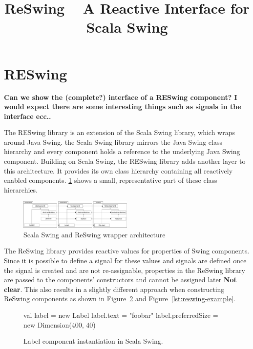 \documentclass{scrartcl}
\title{ReSwing -- A Reactive Interface for Scala Swing}
\author{}
\date{}
\begin{document}
\maketitle






\section{RESwing}

{\bf Can we show the (complete?) interface of a RESwing component? I
  would expect there are some interesting things such as signals in
  the interface ecc..}

The RESwing library is an extension of the Scala Swing library, which
wraps around Java Swing.  the Scala Swing library mirrors the Java
Swing class hierarchy and every component holds a reference to the
underlying Java Swing component. Building on Scala Swing, the RESwing
library adds another layer to this architecture. It provides its own
class hierarchy containing all reactively enabled
components. \ref{fig:overview} shows a small, representative part of
these class hierarchies.

\begin{figure}[htp]
  \centering
  \includegraphics[width=0.5\textwidth]{images/overview}
  \caption{Scala Swing and ReSwing wrapper architecture}
  \label{fig:overview}
\end{figure}

The ReSwing library provides reactive values for properties of Swing
components. Since it is possible to define a signal for these values
and signals are defined once the signal is created and are not
re-assignable, properties in the ReSwing library are passed to the
components' constructors and cannot be assigned later {\bf Not
  clear}. This also results in a slightly different approach when
constructing ReSwing components as shown in
Figure~\ref{lst:scala-swing-example} and
Figure~\ref{lst:reswing-example}.


\begin{figure}[htp]
\begin{codenv}
val label = new Label
label.text = "foobar"
label.preferredSize = new Dimension(400, 40)
\end{codenv}
\caption{Label component instantiation in Scala Swing.}
\label{lst:scala-swing-example}
\end{figure}
\end{document}

